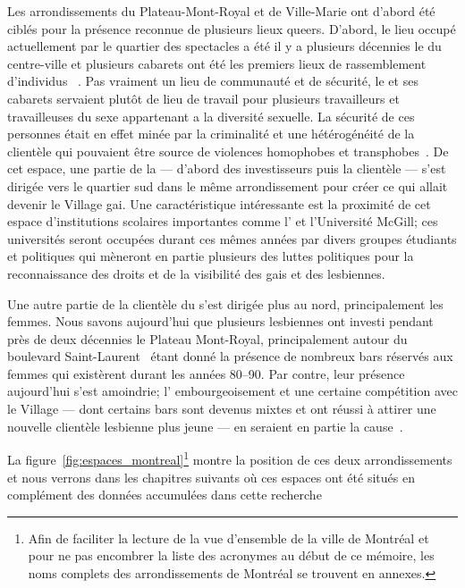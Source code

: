 Les arrondissements du Plateau-Mont-Royal et de Ville-Marie ont d'abord été ciblés pour la présence reconnue de plusieurs lieux queers. 
D'abord, le lieu occupé actuellement par le quartier des spectacles a été il y a plusieurs décennies le  du centre-ville et plusieurs cabarets ont été les premiers lieux de rassemblement d'individus \lgbt{}~\citep[198]{Podmore2015}.
Pas vraiment un lieu de communauté et de sécurité, le  et ses cabarets servaient plutôt de lieu de travail pour plusieurs travailleurs et travailleuses du sexe appartenant a la diversité sexuelle. 
La sécurité de ces personnes était en effet minée par la criminalité et une hétérogénéité de la clientèle qui pouvaient être source de violences homophobes et transphobes~\parencite[91]{Higgins1999}. 
De cet espace, une partie de la  --- d'abord des investisseurs puis la clientèle --- s'est dirigée vers le quartier sud dans le même arrondissement pour créer ce qui allait devenir le Village gai. 
Une caractéristique intéressante est la proximité de cet espace d'institutions scolaires importantes comme l'\uqam{} et l'Université McGill; ces universités seront occupées durant ces mêmes années par divers groupes étudiants et politiques qui mèneront en partie plusieurs des luttes politiques pour la reconnaissance des droits et de la visibilité des gais et des lesbiennes.

Une autre partie de la clientèle \lgbt{} du  s'est dirigée plus au nord, principalement les femmes. 
Nous savons aujourd'hui que plusieurs lesbiennes ont investi pendant près de deux décennies le Plateau Mont-Royal, principalement autour du boulevard Saint-Laurent~\citep[599]{Podmore2006} étant donné la présence de nombreux bars réservés aux femmes qui existèrent durant les années 80--90. 
Par contre, leur présence aujourd'hui s'est amoindrie; l’ embourgeoisement et une certaine compétition avec le Village --- dont certains bars sont devenus mixtes et ont réussi à attirer une nouvelle clientèle lesbienne plus jeune --- en seraient en partie la cause~\citep{Podmore2015}.

La figure~\ref{fig:espaces_montreal}\footnote{Afin de faciliter la lecture de la   vue d'ensemble de la ville de Montréal et pour ne pas encombrer la liste des   acronymes au début de ce mémoire, les noms complets des arrondissements de   Montréal se trouvent en annexes.} montre la position de ces deux arrondissements et nous verrons dans les chapitres suivants où ces espaces ont été situés en complément des données accumulées dans cette recherche 

